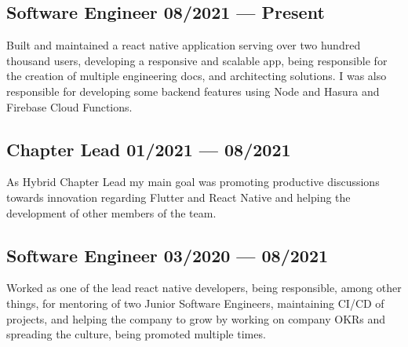 \documentclass[letter,10pt]{article}
\begin{document}
\subsection{{Software Engineer \hfill 08/2021 --- Present}}
\vspace{3mm}
Built and maintained a react native application serving over two hundred thousand users, developing a responsive and scalable app, being responsible for the creation of multiple engineering docs, and architecting solutions. I was also responsible for developing some backend features using Node and Hasura and Firebase Cloud Functions.
\vspace{1mm}


\subsection{{Chapter Lead \hfill 01/2021 --- 08/2021}}
\vspace{3mm}
As Hybrid Chapter Lead my main goal was promoting productive discussions towards innovation regarding Flutter and React Native and helping the development of other members of the team.
\vspace{1mm}

\subsection{{Software Engineer \hfill 03/2020 --- 08/2021}}
\vspace{3mm}
Worked as one of the lead react native developers, being responsible, among other things, for mentoring of two Junior Software Engineers, maintaining CI/CD of projects, and helping the company to grow by working on company OKRs and spreading the culture, being promoted multiple times.
\vspace{1mm}
\end{document}
